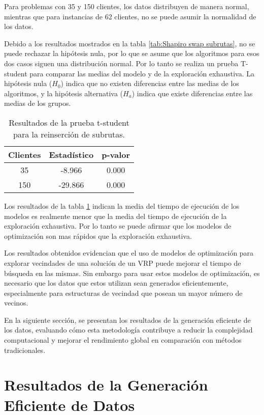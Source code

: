 \documentclass[12pt]{report}
\begin{document}
Para problemas con 35 y 150 clientes, los datos distribuyen de manera normal, mientras que para instancias de 62 clientes, no se puede asumir la normalidad de los datos.

Debido a los resultados mostrados en la tabla \ref{tab:Shapiro swap subrutas}, no se puede rechazar la hipótesis nula, por lo que se asume que los algoritmos para esos dos casos siguen una distribución normal. Por lo tanto se realiza un prueba T-student para comparar las medias del modelo y de la exploración exhaustiva. La hipótesis nula ($H_0$) indica que no existen diferencias entre las medias de los algoritmos, y la hipótesis alternativa ($H_a$) indica que existe diferencias entre las medias de los grupos.


\begin{table}[h]
	\centering
	\begin{tabular}{|c|c|c|}
		\hline
		\textbf{Clientes} & \textbf{Estadístico} & \textbf{p-valor} \\
		\hline
		35  & -8.966 & 0.000 \\
		\hline
		150 & -29.866 & 0.000 \\
		\hline
	\end{tabular}
	\caption{Resultados de la prueba t-student para la reinserción de subrutas.}
	\label{tab:t-student reinsercion subrutas}
\end{table}

Los resultados de la tabla \ref{tab:t-student reinsercion subrutas} indican la media del tiempo de ejecución de los modelos es realmente menor que la media del tiempo de ejecución de la exploración exhaustiva. Por lo tanto se puede afirmar que los modelos de optimización son mas rápidos que la exploración exhaustiva.

Los resultados obtenidos evidencian que el uso de modelos de optimización para explorar vecindades de una solución de un VRP puede mejorar el tiempo de búsqueda en las mismas. Sin embargo para usar estos modelos de optimización, es necesario que los datos que estos utilizan sean generados eficientemente, especialmente para estructuras de vecindad que posean un mayor número de vecinos.

En la siguiente sección, se presentan los resultados de la generación eficiente de los datos, evaluando cómo esta metodología contribuye a reducir la complejidad computacional y mejorar el rendimiento global en comparación con métodos tradicionales.




\section{Resultados de la Generación Eficiente de Datos}
\label{sec:Resultados de la Generación Eficiente de Datos}
\end{document}
